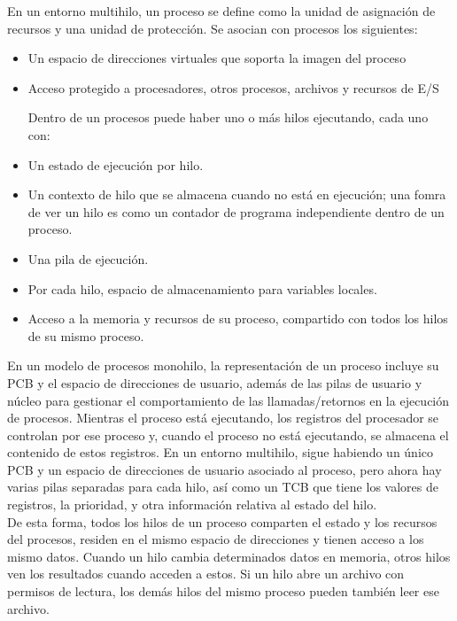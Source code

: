 \documentclass{article}
\begin{document}
					En un entorno multihilo, un proceso se define como la unidad de asignación de recursos y una unidad de protección. Se asocian con procesos los siguientes:
					
					\begin{itemize}
					\item Un espacio de direcciones virtuales que soporta la imagen del proceso
					\item Acceso protegido a procesadores, otros procesos, archivos y recursos de E/S
					
					Dentro de un procesos puede haber uno o más hilos ejecutando, cada uno con:
					
					\item Un estado de ejecución por hilo.
					\item Un contexto de hilo que se almacena cuando no está en ejecución; una fomra de ver un hilo es como un contador de programa independiente dentro de un proceso.
					\item Una pila de ejecución.
					\item Por cada hilo, espacio de almacenamiento para variables locales.
					\item Acceso a la memoria y recursos de su proceso, compartido con todos los hilos de su mismo proceso.
					\end{itemize}
					
					En un modelo de procesos monohilo, la representación de un proceso incluye su PCB y el espacio de direcciones de usuario, además de las pilas de usuario y núcleo para gestionar el comportamiento de las llamadas/retornos en la ejecución de procesos. Mientras el proceso está ejecutando, los registros del procesador se controlan por ese proceso y, cuando el proceso no está ejecutando, se almacena el contenido de estos registros. En un entorno multihilo, sigue habiendo un único PCB y un espacio de direcciones de usuario asociado al proceso, pero ahora hay varias pilas separadas para cada hilo, así como un TCB que tiene los valores de registros, la prioridad, y otra información relativa al estado del hilo. \\
					
					De esta forma, todos los hilos de un proceso comparten el estado y los recursos del procesos, residen en el mismo espacio de direcciones y tienen acceso a los mismo datos. Cuando un hilo cambia determinados datos en memoria, otros hilos ven los resultados cuando acceden a estos. Si un hilo abre un archivo con permisos de lectura, los demás hilos del mismo proceso pueden también leer ese archivo. \\
					
\end{document}
